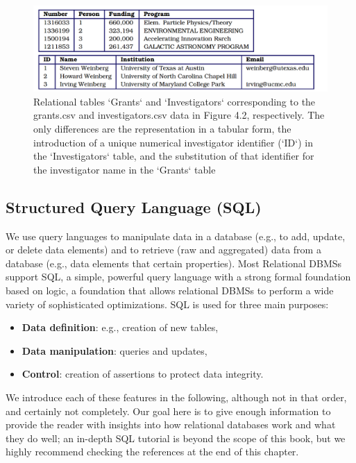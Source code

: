 \documentclass[]{krantz}
\begin{document}
\begin{figure}

{\centering \includegraphics[width=0.7\linewidth]{ChapterDB/figures/figdb-2} 

}

\caption{Relational tables `Grants` and `Investigators` corresponding to the grants.csv and investigators.csv data in Figure 4.2, respectively. The only differences are the representation in a tabular form, the introduction of a unique numerical investigator identifier (`ID`) in the `Investigators` table, and the substitution of that identifier for the investigator name in the `Grants` table}\label{fig:figdb-2}
\end{figure}

\subsection{Structured Query Language
(SQL)}\label{structured-query-language-sql}

We use query languages to manipulate data in a database (e.g., to add,
update, or delete data elements) and to retrieve (raw and aggregated)
data from a database (e.g., data elements that certain properties). Most
Relational DBMSs support SQL, a simple, powerful query language with a
strong formal foundation based on logic, a foundation that allows
relational DBMSs to perform a wide variety of sophisticated
optimizations. SQL is used for three main purposes:

\begin{itemize}
\item
  \textbf{Data definition}: e.g., creation of new tables,
\item
  \textbf{Data manipulation}: queries and updates,
\item
  \textbf{Control}: creation of assertions to protect data integrity.
\end{itemize}

We introduce each of these features in the following, although not in
that order, and certainly not completely. Our goal here is to give
enough information to provide the reader with insights into how
relational databases work and what they do well; an in-depth SQL
tutorial is beyond the scope of this book, but we highly recommend
checking the references at the end of this chapter.
\end{document}
